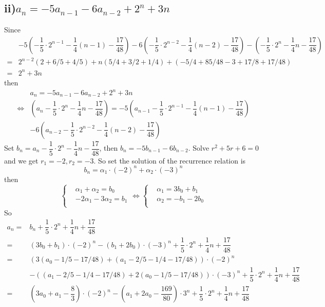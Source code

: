 \documentclass[a4paper,12pt,titlepage]{article}
\begin{document}
\subsection*{ii)$a_n=-5a_{n-1}-6a_{n-2}+2^n+3n$}
Since 
\begin{align*}
&-5(-\dfrac{1}{5}\cdot 2^{n-1}-\dfrac{1}{4}(n-1)-\dfrac{17}{48})-6(-\dfrac{1}{5}\cdot 2^{n-2}-\dfrac{1}{4}(n-2)-\dfrac{17}{48})-(-\dfrac{1}{5}\cdot 2^{n}-\dfrac{1}{4}n-\dfrac{17}{48})\\
=&2^{n-2}(2+6/5+4/5)+n(5/4+3/2+1/4)+(-5/4+85/48-3+17/8+17/48)\\
=&2^n+3n
\end{align*}
then
\begin{align*}
&a_n=-5a_{n-1}-6a_{n-2}+2^n+3n\\
\Leftrightarrow& (a_n-\dfrac{1}{5}\cdot 2^{n}-\dfrac{1}{4}n-\dfrac{17}{48})=-5(a_{n-1}-\dfrac{1}{5}\cdot 2^{n-1}-\dfrac{1}{4}(n-1)-\dfrac{17}{48})\\&-6(a_{n-2}-\dfrac{1}{5}\cdot 2^{n-2}-\dfrac{1}{4}(n-2)-\dfrac{17}{48})
\end{align*} 
Set $b_n=a_n-\dfrac{1}{5}\cdot 2^{n}-\dfrac{1}{4}n-\dfrac{17}{48}$, then $b_n=-5b_{n-1}-6b_{n-2}$. Solve $r^2+5r+6=0$ and we get $r_1=-2,r_2=-3$. So set the solution of the recurrence relation is
$$b_n=\alpha_1 \cdot (-2)^n+\alpha_2\cdot(-3)^n$$
then
$$\left\{
\begin{aligned}
&\alpha_1+\alpha_2=b_0\\
&-2\alpha_1-3\alpha_2=b_1\\
\end{aligned}
\right.\Leftrightarrow \left\{
\begin{aligned}
&\alpha_1=3b_0+b_1\\
&\alpha_2=-b_1-2b_0\\
\end{aligned}
\right. $$	
So 
\begin{align*}
a_n=&b_n+\dfrac{1}{5}\cdot 2^{n}+\dfrac{1}{4}n+\dfrac{17}{48}\\=&(3b_0+b_1)\cdot (-2)^n-(b_1+2b_0)\cdot(-3)^n+\dfrac{1}{5}\cdot 2^{n}+\dfrac{1}{4}n+\dfrac{17}{48}\\
=&(3(a_0-1/5-17/48)+(a_1-2/5-1/4-17/48))\cdot (-2)^n\\&-((a_1-2/5-1/4-17/48)+2(a_0-1/5-17/48))\cdot(-3)^n+\dfrac{1}{5}\cdot 2^{n}+\dfrac{1}{4}n+\dfrac{17}{48}\\
=&(3a_0+a_1-\dfrac{8}{3})\cdot (-2)^n-(a_1+2a_0-\dfrac{169}{80})\cdot3^n+\dfrac{1}{5}\cdot 2^{n}+\dfrac{1}{4}n+\dfrac{17}{48}
\end{align*}
\end{document}
